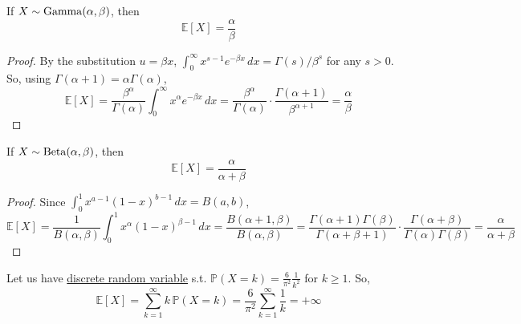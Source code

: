   \begin{theorem}
    \label{thm:expectation-of-gamma}
    If \hyperref[def:gamma-random-variable]{$X \sim \operatorname{Gamma}(\alpha, \beta)$}, then 
    \begin{equation}
      \mathbb{E}[X] = \frac{\alpha}{\beta}
    \end{equation}
  \end{theorem}
  \begin{proof}
    By the substitution $u = \beta x$, $\int_0^\infty x^{s-1} e^{-\beta x} \,dx = \Gamma(s) / \beta^s$ for any $s > 0$. So, using $\Gamma(\alpha + 1) = \alpha \Gamma(\alpha)$, 
    \begin{equation}
      \mathbb{E}[X] = \frac{\beta^\alpha}{\Gamma(\alpha)} \int_0^\infty x^{\alpha} e^{-\beta x} \,dx = \frac{\beta^\alpha}{\Gamma(\alpha)} \cdot \frac{\Gamma(\alpha + 1)}{\beta^{\alpha + 1}} = \frac{\alpha}{\beta}
    \end{equation}
  \end{proof}

  \begin{theorem}
    \label{thm:expectation-of-beta}
    If \hyperref[def:beta-random-variable]{$X \sim \operatorname{Beta}(\alpha, \beta)$}, then 
    \begin{equation}
      \mathbb{E}[X] = \frac{\alpha}{\alpha + \beta}
    \end{equation}
  \end{theorem}
  \begin{proof}
    Since $\int_0^1 x^{a-1} (1-x)^{b-1} \,dx = B(a, b)$, 
    \begin{equation}
      \mathbb{E}[X] = \frac{1}{B(\alpha, \beta)} \int_0^1 x^{\alpha} (1-x)^{\beta-1} \,dx = \frac{B(\alpha + 1, \beta)}{B(\alpha, \beta)} = \frac{\Gamma(\alpha + 1) \Gamma(\beta)}{\Gamma(\alpha + \beta + 1)} \cdot \frac{\Gamma(\alpha + \beta)}{\Gamma(\alpha) \Gamma(\beta)} = \frac{\alpha}{\alpha + \beta}
    \end{equation}
  \end{proof}

  \begin{example}
    \label{ex:infinite-expectation}
    Let us have \hyperref[def:discrete-random-variable]{discrete random variable} s.t. $\mathbb{P}(X = k) = \frac{6}{\pi^2} \frac{1}{k^2}$ for $k \geq 1$. So, 
    \begin{equation}
      \mathbb{E}[X] = \sum_{k=1}^\infty k \, \mathbb{P}(X = k) = \frac{6}{\pi^2} \sum_{k=1}^\infty \frac{1}{k} = +\infty
    \end{equation}
  \end{example}

